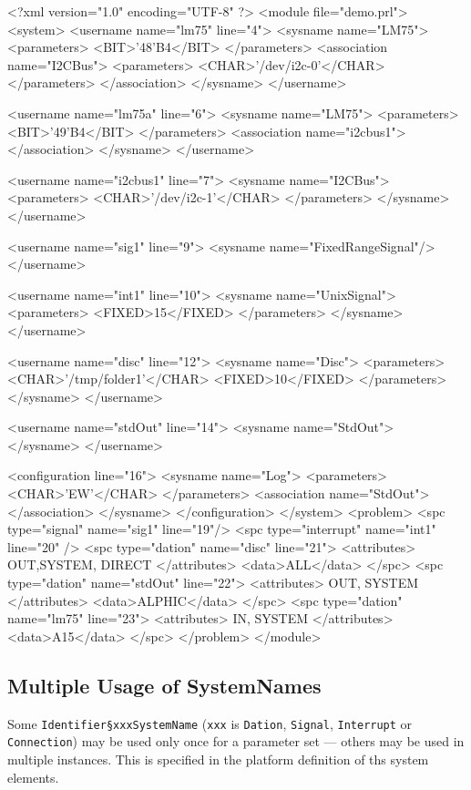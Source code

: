 \begin{XMLCode}
<?xml version="1.0" encoding="UTF-8" ?>
<module file="demo.prl">
<system>
   <username name="lm75" line="4">
      <sysname name="LM75">
      <parameters>
         <BIT>'48'B4</BIT>
      </parameters>
      <association name="I2CBus">
         <parameters>
            <CHAR>'/dev/i2c-0'</CHAR>
         </parameters>
      </association>
   </sysname>
</username>

<username name="lm75a" line="6">
   <sysname name="LM75">
      <parameters>
         <BIT>'49'B4</BIT>
      </parameters>
      <association name="i2cbus1">
      </association>
   </sysname>
</username>

<username name="i2cbus1" line="7">
   <sysname name="I2CBus">
      <parameters>
         <CHAR>'/dev/i2c-1'</CHAR>
      </parameters>
   </sysname>
</username>

<username name="sig1" line="9">
   <sysname name="FixedRangeSignal"/>
</username>

<username name="int1" line="10">
   <sysname name="UnixSignal">
      <parameters>
         <FIXED>15</FIXED>
      </parameters>
   </sysname>
</username>

<username name="disc" line="12">
   <sysname name="Disc">
      <parameters>
         <CHAR>'/tmp/folder1'</CHAR>
         <FIXED>10</FIXED>
      </parameters>
   </sysname>
</username>

<username name="stdOut" line="14">
   <sysname name="StdOut">
   </sysname>
</username> 

<configuration line="16">
   <sysname name="Log">
      <parameters>
         <CHAR>'EW'</CHAR>
      </parameters>
      <association name="StdOut">
      </association>
   </sysname>
</configuration>
</system>
<problem>
<spc type="signal" name="sig1" line="19"/>
<spc type="interrupt" name="int1" line="20" />
<spc type="dation" name="disc" line="21">
   <attributes> OUT,SYSTEM, DIRECT </attributes>
   <data>ALL</data>
</spc>
<spc type="dation" name="stdOut" line="22">
      <attributes> OUT, SYSTEM </attributes>
      <data>ALPHIC</data>
</spc>
<spc type="dation" name="lm75" line="23">
      <attributes> IN, SYSTEM </attributes>
      <data>A15</data>
</spc>
</problem>
</module>
\end{XMLCode}

\subsection{Multiple Usage of SystemNames}
Some \verb|Identifier§xxxSystemName| (\verb|xxx| is \verb|Dation|, \verb|Signal|,
\verb|Interrupt| or \verb|Connection|) may be used only once for a parameter set
--- others may be used in multiple instances.
This is specified in the platform definition of ths system elements.

